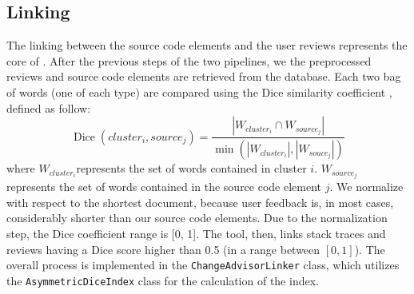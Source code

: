 \subsection{Linking}
The linking between the source code elements and the user reviews represents the core of \tool{}. After the previous steps of the two pipelines, we the preprocessed reviews and source code elements are retrieved from the database.
Each two bag of words (one of each type) are compared using the Dice similarity coefficient \cite{dice1945measures}, defined as follow:
\begin{equation*}
	\operatorname{Dice}\left(\mathit{cluster}_{i}, \mathit{source}_{j}\right) = \frac{\left|\mathit{W}_{\mathit{cluster}_{i}} \cap \mathit{W}_{\mathit{source}_{j}}\right|}{\min\left(\left|\mathit{W}_{\mathit{cluster}_{i}}\right|, \left|\mathit{W}_{\mathit{souce}_{j}}\right|\right)}
\end{equation*}
where $\mathit{W}_{\mathit{cluster}_{i}}$represents the set of words contained in cluster $i$. $\mathit{W}_{\mathit{source}_{j}}$ represents the set of words contained in the source code element $j$.
We normalize with respect to the shortest document, because user feedback is, in most cases, considerably shorter than our source code elements. Due to the normalization step, the Dice coefficient range is [0, 1].
The tool, then, links stack traces and reviews having a Dice score higher than 0.5 (in a range between $\left[0, 1\right]$).
The overall process is implemented in the \texttt{ChangeAdvisorLinker} class, which utilizes the \texttt{AsymmetricDiceIndex} class for the calculation of the index.
